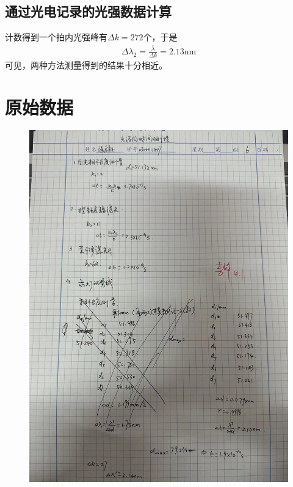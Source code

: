 \documentclass{ctexart}
\begin{document}
	\subsection{通过光电记录的光强数据计算}
	计数得到一个拍内光强峰有$\Delta k=272$个，于是
	\begin{align}
		\Delta \lambda_2=\frac{\bar{\lambda}}{\Delta k}=2.13\mathrm{nm}
	\end{align}
	可见，两种方法测量得到的结果十分相近。
	\section{原始数据}
	\begin{figure}[H]
		\centering
		\includegraphics[width=14cm]{fig.jpg}
	\end{figure}
\end{document}
